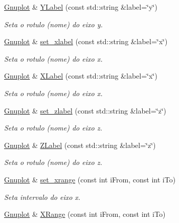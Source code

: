 \begin{DoxyCompactItemize}
\hyperlink{class_gnuplot}{Gnuplot} \& \hyperlink{class_gnuplot_ab4cdb8c1abd919b9851ca9a81667f2a4}{Y\+Label} (const std\+::string \&label=\char`\"{}y\char`\"{})
\begin{DoxyCompactList}\small\item\em Seta o rotulo (nome) do eixo y. \end{DoxyCompactList}\item 
\hyperlink{class_gnuplot}{Gnuplot} \& \hyperlink{class_gnuplot_a58808028aec03a22b5c19693b14baeef}{set\+\_\+xlabel} (const std\+::string \&label=\char`\"{}x\char`\"{})
\begin{DoxyCompactList}\small\item\em Seta o rotulo (nome) do eixo x. \end{DoxyCompactList}\item 
\hyperlink{class_gnuplot}{Gnuplot} \& \hyperlink{class_gnuplot_ac36ea75f0759c98da946389e60c12278}{X\+Label} (const std\+::string \&label=\char`\"{}x\char`\"{})
\begin{DoxyCompactList}\small\item\em Seta o rotulo (nome) do eixo x. \end{DoxyCompactList}\item 
\hyperlink{class_gnuplot}{Gnuplot} \& \hyperlink{class_gnuplot_ab3206e715d20f05cc0dd1eec89ce8b07}{set\+\_\+zlabel} (const std\+::string \&label=\char`\"{}z\char`\"{})
\begin{DoxyCompactList}\small\item\em Seta o rotulo (nome) do eixo z. \end{DoxyCompactList}\item 
\hyperlink{class_gnuplot}{Gnuplot} \& \hyperlink{class_gnuplot_ace776aa2b273c0ec934e856cb28416eb}{Z\+Label} (const std\+::string \&label=\char`\"{}z\char`\"{})
\begin{DoxyCompactList}\small\item\em Seta o rotulo (nome) do eixo z. \end{DoxyCompactList}\item 
\hyperlink{class_gnuplot}{Gnuplot} \& \hyperlink{class_gnuplot_a726232ac7226b9fc8811eaefa87c902b}{set\+\_\+xrange} (const int i\+From, const int i\+To)
\begin{DoxyCompactList}\small\item\em Seta intervalo do eixo x. \end{DoxyCompactList}\item 
\hyperlink{class_gnuplot}{Gnuplot} \& \hyperlink{class_gnuplot_a3fb5c7726e954739d847edd2670705fe}{X\+Range} (const int i\+From, const int i\+To)

\end{DoxyCompactItemize}
